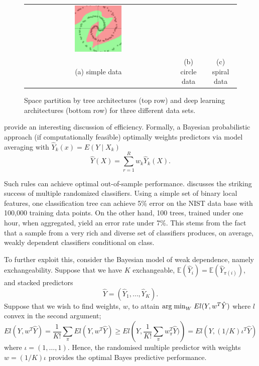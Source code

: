 \documentclass[12pt]{article}
\begin{document}
\begin{figure}[H]
\begin{tabular}{ccc}
		\includegraphics[width=0.33\textwidth]{spiral_data_dl} \\
		(a) simple data & (b) circle data & (c) spiral data
	\end{tabular}
	\caption{Space partition by tree architectures (top row) and deep learning architectures (bottom row) for three different data sets.}
	\label{fig:tree-dl-comp}
\end{figure}



\cite{amit_shape_1997} provide an interesting discussion of efficiency. Formally, a Bayesian probabilistic approach (if computationally feasible) optimally weights predictors via model averaging with  $\hat{Y}_k(x) = E(Y \mid X_k)$
$$
\hat{Y}(X) = \sum_{r=1}^R w_k \hat{Y}_k(X).
$$


Such rules can achieve optimal out-of-sample performance.  \cite{amit2000multiple} discusses the striking success of multiple randomized classifiers. Using a simple set of binary local features, one classification tree can achieve 5\% error on the NIST data base with 100,000 training data points. On the other hand, 100 trees, trained under one hour, when aggregated, yield an error rate under 7\%. This stems from the fact that a sample from a very rich and diverse set of classifiers produces, on average, weakly dependent classifiers conditional on class. 

To further exploit this, consider the Bayesian model of weak dependence, namely exchangeability. Suppose that we have  $K$ exchangeable, $ \mathbb{E} ( \hat{Y}_i ) = \mathbb{E} ( \hat{Y}_{\pi(i)} ) $, and stacked predictors
$$
\hat{Y} = ( \hat{Y}_1 , \ldots , \hat{Y}_K ). 
$$
Suppose that we wish to find weights, $w$, to attain $ {\rm arg \; min}_W \; E l( Y , w^T \hat{Y} ) $ where $l$ convex in the second argument;
\[
E l( Y , w^T \hat{Y} )  = \frac{1}{K!} \sum_\pi E l( Y , w^T \hat{Y} )
 \geq  E l \left ( Y , \frac{1}{K!} \sum_\pi w_\pi^T \hat{Y} )\right ) =  E l \left ( Y , (1/K) \iota^T \hat{Y} \right ) 
\]
where $ \iota = ( 1 , \ldots ,1 ) $. Hence, the randomised multiple predictor with weights $w = (1/K)\iota$  provides the optimal Bayes predictive performance. 
\end{document}
